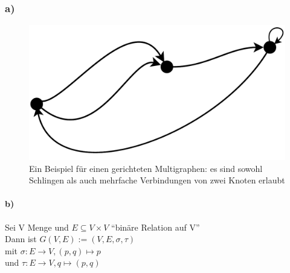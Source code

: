 \subsubsection*{a)}
\begin{figure}[H]
  \begin{center}
  \includegraphics[scale=0.5,keepaspectratio=true]{../bilder/multigraph_bsp.pdf}
 \end{center}
 \caption{Ein Beispiel für einen gerichteten Multigraphen: es sind sowohl Schlingen als auch mehrfache Verbindungen von zwei Knoten erlaubt}
\end{figure}

\paragraph{b)}
Sei V Menge und $E \subseteq V \times V $ ``binäre Relation auf V''
\\Dann ist $G(V,E) := (V,E, \sigma, \tau) $
\\mit $\sigma : E \rightarrow V, (p,q) \mapsto p$
\\und $\tau : E \rightarrow V, q \mapsto (p,q)$


